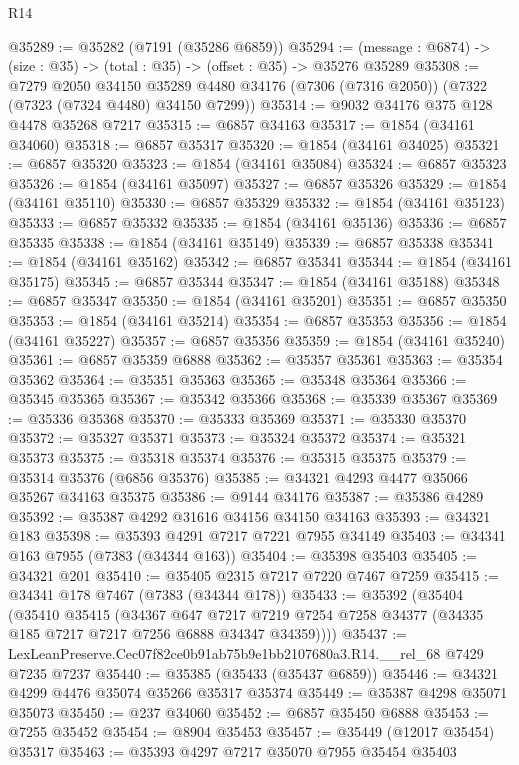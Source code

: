 \begin{lexlean}{R14}
\begin{coremodule}
@35289 := @35282 (@7191 (@35286 @6859))
@35294 := (message : @6874) -> (size : @35) -> (total : @35) -> (offset : @35) -> @35276 @35289
@35308 := @7279
    @2050
    @34150
    @35289
    @4480
    @34176
    (@7306 (@7316 @2050))
    (@7322 (@7323 (@7324 @4480) @34150 @7299))
@35314 := @9032 @34176 @375 @128 @4478 @35268 @7217
@35315 := @6857 @34163
@35317 := @1854 (@34161 @34060)
@35318 := @6857 @35317
@35320 := @1854 (@34161 @34025)
@35321 := @6857 @35320
@35323 := @1854 (@34161 @35084)
@35324 := @6857 @35323
@35326 := @1854 (@34161 @35097)
@35327 := @6857 @35326
@35329 := @1854 (@34161 @35110)
@35330 := @6857 @35329
@35332 := @1854 (@34161 @35123)
@35333 := @6857 @35332
@35335 := @1854 (@34161 @35136)
@35336 := @6857 @35335
@35338 := @1854 (@34161 @35149)
@35339 := @6857 @35338
@35341 := @1854 (@34161 @35162)
@35342 := @6857 @35341
@35344 := @1854 (@34161 @35175)
@35345 := @6857 @35344
@35347 := @1854 (@34161 @35188)
@35348 := @6857 @35347
@35350 := @1854 (@34161 @35201)
@35351 := @6857 @35350
@35353 := @1854 (@34161 @35214)
@35354 := @6857 @35353
@35356 := @1854 (@34161 @35227)
@35357 := @6857 @35356
@35359 := @1854 (@34161 @35240)
@35361 := @6857 @35359 @6888
@35362 := @35357 @35361
@35363 := @35354 @35362
@35364 := @35351 @35363
@35365 := @35348 @35364
@35366 := @35345 @35365
@35367 := @35342 @35366
@35368 := @35339 @35367
@35369 := @35336 @35368
@35370 := @35333 @35369
@35371 := @35330 @35370
@35372 := @35327 @35371
@35373 := @35324 @35372
@35374 := @35321 @35373
@35375 := @35318 @35374
@35376 := @35315 @35375
@35379 := @35314 @35376 (@6856 @35376)
@35385 := @34321 @4293 @4477 @35066 @35267 @34163 @35375
@35386 := @9144 @34176
@35387 := @35386 @4289
@35392 := @35387 @4292 @31616 @34156 @34150 @34163
@35393 := @34321 @183
@35398 := @35393 @4291 @7217 @7221 @7955 @34149
@35403 := @34341 @163 @7955 (@7383 (@34344 @163))
@35404 := @35398 @35403
@35405 := @34321 @201
@35410 := @35405 @2315 @7217 @7220 @7467 @7259
@35415 := @34341 @178 @7467 (@7383 (@34344 @178))
@35433 := @35392
    (@35404
      (@35410
        @35415
        (@34367
          @647
          @7217
          @7219
          @7254
          @7258
          @34377
          (@34335 @185 @7217 @7217 @7256 @6888 @34347 @34359))))
@35437 := LexLeanPreserve.Cec07f82ce0b91ab75b9e1bb2107680a3.R14.__rel_68 @7429 @7235 @7237
@35440 := @35385 (@35433 (@35437 @6859))
@35446 := @34321 @4299 @4476 @35074 @35266 @35317 @35374
@35449 := @35387 @4298 @35071 @35073
@35450 := @237 @34060
@35452 := @6857 @35450 @6888
@35453 := @7255 @35452
@35454 := @8904 @35453
@35457 := @35449 (@12017 @35454) @35317
@35463 := @35393 @4297 @7217 @35070 @7955 @35454 @35403

\end{coremodule}
\end{lexlean}
